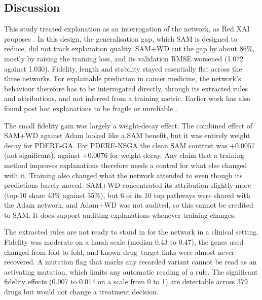 \subsection{Discussion}
\label{sec:discussion}

This study treated explanation as an interrogation of the network, as Red XAI proposes \citep{biecek2024}. In this design, the generalisation gap, which SAM is designed to reduce, did not track explanation quality. SAM+WD cut the gap by about 86\%, mostly by raising the training loss, and its validation RMSE worsened (1.072 against 1.030). Fidelity, length and stability stayed essentially flat across the three networks. For explainable prediction in cancer medicine, the network's behaviour therefore has to be interrogated directly, through its extracted rules and attributions, and not inferred from a training metric. Earlier work has also found post hoc explanations to be fragile or unreliable \citep{ghorbani2019,slack2020}.

The small fidelity gain was largely a weight-decay effect. The combined effect of SAM+WD against Adam looked like a SAM benefit, but it was entirely weight decay for PDERE-GA. For PDERE-NSGA the clean SAM contrast was $+0.0057$ (not significant), against $+0.0076$ for weight decay. Any claim that a training method improves explanations therefore needs a control for what else changed with it. Training also changed what the network attended to even though its predictions barely moved. SAM+WD concentrated its attribution slightly more (top-10 share 43\% against 35\%), but 6 of its 10 top pathways were shared with the Adam network, and Adam+WD was not audited, so this cannot be credited to SAM. It does support auditing explanations whenever training changes.

The extracted rules are not ready to stand in for the network in a clinical setting. Fidelity was moderate on a harsh scale (median 0.43 to 0.47), the genes used changed from fold to fold, and known drug--target links were almost never recovered. A mutation flag that marks any recorded variant cannot be read as an activating mutation, which limits any automatic reading of a rule. The significant fidelity effects (0.007 to 0.014 on a scale from 0 to 1) are detectable across 379 drugs but would not change a treatment decision.


